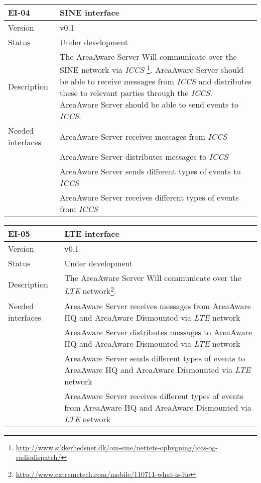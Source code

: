 \begin{longtable}{| p{3.5cm} |  p{10cm} | }
	\hline
	\textbf{EI-04} &  \textbf{SINE interface} \\
	\hline
	Version & v0.1 \\
	\hline
	Status & Under development \\
	\hline
	Description & The AreaAware Server Will communicate over the SINE network via \emph{ICCS} \footnote{\url{http://www.sikkerhedsnet.dk/om-sine/nettets-opbygning/iccs-og-radiodispatch/}}. AreaAware Server should be able to receive messages from \emph{ICCS} and distributes these to relevant parties through the \emph{ICCS}.  AreaAware Server should be able to send events to \emph{ICCS}.
	\\
	\hline
	Needed interfaces 
	& AreaAware Server receives messages from \emph{ICCS} \\
	& AreaAware Server distributes messages to \emph{ICCS} \\
	& AreaAware Server sends different types of events to \emph{ICCS} \\
	& AreaAware Server receives different types of events from \emph{ICCS} \\
	\hline
\end{longtable}

\begin{longtable}{| p{3.5cm} |  p{10cm} | }
	\hline
	\textbf{EI-05} &  \textbf{LTE interface} \\
	\hline
	Version & v0.1 \\
	\hline
	Status & Under development \\
	\hline
	Description & The AreaAware Server Will communicate over the \emph{LTE} network\footnote{\url{http://www.extremetech.com/mobile/110711-what-is-lte}}.
	\\
	\hline
	Needed interfaces 
	& AreaAware Server receives messages from AreaAware HQ and AreaAware Dismounted via \emph{LTE} network \\
	& AreaAware Server distributes messages to AreaAware HQ and AreaAware Dismounted via \emph{LTE} network \\ 
	& AreaAware Server sends different types of events to AreaAware HQ and AreaAware Dismounted via \emph{LTE} network \\
	& AreaAware Server receives different types of events from AreaAware HQ and AreaAware Dismounted via \emph{LTE} network \\
	\hline
\end{longtable}
